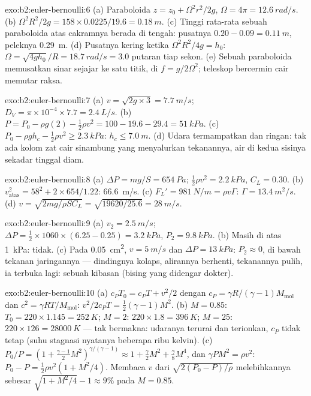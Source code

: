 \begin{solution}{exo:b2:euler-bernoulli:6}
(a) Paraboloida $z = z_0 + \Omega^2r^2/2g$, $\Omega = 4\pi = \qty{12.6}{rad/s}$. (b)
$\Omega^2R^2/2g = 158 \times 0.0225/19.6 = \qty{0.18}{m}$. (c) Tinggi rata-rata sebuah
paraboloida atas cakramnya berada di tengah: pusatnya $0.20 - 0.09 = \qty{0.11}{m}$, peleknya
\qty{0.29}{m}. (d) Pusatnya kering ketika $\Omega^2R^2/4g = h_0$: $\Omega = \sqrt{4gh_0}/R =
\qty{18.7}{rad/s} = 3.0$ putaran tiap sekon. (e) Sebuah paraboloida memusatkan
sinar sejajar ke satu titik, di $f = g/2\Omega^2$; teleskop bercermin cair
memutar raksa.
\end{solution}

\begin{solution}{exo:b2:euler-bernoulli:7}
(a) $v = \sqrt{2g \times 3} = \qty{7.7}{m/s}$; $D_V = \pi \times 10^{-4} \times 7.7 =
\qty{2.4}{L/s}$. (b) $P = P_0 - \rho g(2) - \tfrac12\rho v^2 = 100 - 19.6 - 29.4 =
\qty{51}{kPa}$. (c) $P_0 - \rho gh_c - \tfrac12\rho v^2 \ge \qty{2.3}{kPa}$: $h_c \le
\qty{7.0}{m}$. (d) Udara termampatkan dan ringan: tak ada kolom zat cair
sinambung yang menyalurkan tekanannya, air di kedua sisinya sekadar tinggal diam.
\end{solution}

\begin{solution}{exo:b2:euler-bernoulli:8}
(a) $\Delta P = mg/S = \qty{654}{Pa}$; $\tfrac12\rho v^2 = \qty{2.2}{kPa}$, $C_L = 0.30$.
(b) $v_{\text{atas}}^2 = 58^2 + 2 \times 654/1.22$: \qty{66.6}{m/s}. (c) $F_L' =
\qty{981}{N/m} = \rho v\Gamma$: $\Gamma = \qty{13.4}{m^2/s}$. (d) $v = \sqrt{2mg/
\rho SC_L} = \sqrt{19620/25.6} = \qty{28}{m/s}$.
\end{solution}

\begin{solution}{exo:b2:euler-bernoulli:9}
(a) $v_2 = \qty{2.5}{m/s}$; $\Delta P = \tfrac12 \times 1060 \times (6.25 - 0.25) =
\qty{3.2}{kPa}$, $P_2 = \qty{9.8}{kPa}$. (b) Masih di atas \qty{1}{kPa}: tidak. (c) Pada
\qty{0.05}{cm^2}, $v = \qty{5}{m/s}$ dan $\Delta P = \qty{13}{kPa}$: $P_2 \approx 0$, di bawah
tekanan jaringannya --- dindingnya kolaps, alirannya berhenti,
tekanannya pulih, ia terbuka lagi: sebuah kibasan (bising yang didengar dokter).
\end{solution}

\begin{solution}{exo:b2:euler-bernoulli:10}
(a) $c_PT_0 = c_PT + v^2/2$ dengan $c_P = \gamma R/(\gamma - 1)M_{\text{mol}}$ dan
$c^2 = \gamma RT/M_{\text{mol}}$: $v^2/2c_PT = \tfrac12(\gamma - 1)M^2$. (b) $M =
0.85$: $T_0 = 220 \times 1.145 = \qty{252}{K}$; $M = 2$: $220 \times 1.8 = \qty{396}{K}$;
$M = 25$: $220 \times 126 = \qty{28000}{K}$ --- tak bermakna: udaranya terurai
dan terionkan, $c_P$ tidak tetap (suhu stagnasi nyatanya
beberapa ribu kelvin). (c) $P_0/P = (1 + \tfrac{\gamma - 1}2M^2)^{\gamma/(\gamma
- 1)} \approx 1 + \tfrac{\gamma}2M^2 + \tfrac{\gamma}8M^4$, dan $\gamma PM^2 = \rho v^2$:
$P_0 - P = \tfrac12\rho v^2(1 + M^2/4)$. Membaca $v$ dari $\sqrt{2(P_0 - P)/\rho}$
melebihkannya sebesar $\sqrt{1 + M^2/4} - 1 \approx 9\%$ pada $M = 0.85$.
\end{solution}

